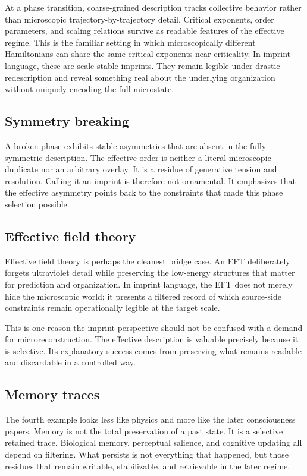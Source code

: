 \documentclass[12pt,a4paper]{article}
\begin{document}
At a phase transition, coarse-grained description tracks collective behavior rather than microscopic trajectory-by-trajectory detail. Critical exponents, order parameters, and scaling relations survive as readable features of the effective regime. This is the familiar setting in which microscopically different Hamiltonians can share the same critical exponents near criticality. In imprint language, these are scale-stable imprints. They remain legible under drastic redescription and reveal something real about the underlying organization without uniquely encoding the full microstate.

\subsection{Symmetry breaking}

A broken phase exhibits stable asymmetries that are absent in the fully symmetric description. The effective order is neither a literal microscopic duplicate nor an arbitrary overlay. It is a residue of generative tension and resolution. Calling it an imprint is therefore not ornamental. It emphasizes that the effective asymmetry points back to the constraints that made this phase selection possible.

\subsection{Effective field theory}

Effective field theory is perhaps the cleanest bridge case. An EFT deliberately forgets ultraviolet detail while preserving the low-energy structures that matter for prediction and organization. In imprint language, the EFT does not merely hide the microscopic world; it presents a filtered record of which source-side constraints remain operationally legible at the target scale.

This is one reason the imprint perspective should not be confused with a demand for microreconstruction. The effective description is valuable precisely because it is selective. Its explanatory success comes from preserving what remains readable and discardable in a controlled way.

\subsection{Memory traces}

The fourth example looks less like physics and more like the later consciousness papers. Memory is not the total preservation of a past state. It is a selective retained trace. Biological memory, perceptual salience, and cognitive updating all depend on filtering. What persists is not everything that happened, but those residues that remain writable, stabilizable, and retrievable in the later regime.
\end{document}
